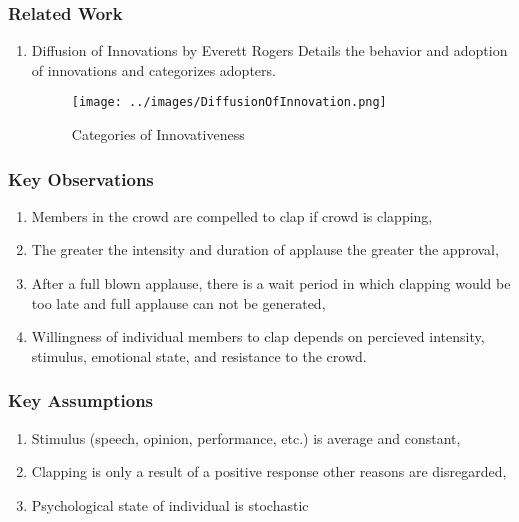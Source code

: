 \documentclass[compress,handout,10pt]{beamer}
\let\olditem\item
\renewcommand{\item}{\setlength{\itemsep}{0.5\baselineskip}\olditem}
\begin{document}
\begin{frame}
  \frametitle{Related Work}
	\begin{enumerate}
		\item Diffusion of Innovations by Everett Rogers \newline\newline
		Details the behavior and adoption of innovations and categorizes adopters.
\begin{figure}[h]
    \begin{center}
        \texttt{[image: ../images/DiffusionOfInnovation.png]}
    \end{center}
    \caption{Categories of Innovativeness}
    \label{diffusion}
\end{figure}
	\end{enumerate}
\end{frame} 

\begin{frame}
  \frametitle{Key Observations}
	\begin{enumerate}
		\item Members in the crowd are compelled to clap if crowd is clapping,\newline
		\item The greater the intensity and duration of applause the greater the approval,\newline
		\item After a full blown applause, there is a wait period in which clapping would be too late and full applause can not be generated,\newline
		\item Willingness of individual members to clap depends on percieved intensity, stimulus, emotional state, and resistance to the crowd.
	\end{enumerate}

\end{frame}

\begin{frame}
   \frametitle{Key Assumptions}
	\begin {enumerate}
		\item Stimulus (speech, opinion, performance, etc.)  is average and constant,\newline
		\item Clapping is only a result of a positive response other reasons are disregarded,\newline
		\item Psychological state of individual is stochastic
	\end{enumerate}	
\end{frame}
\end{document}
